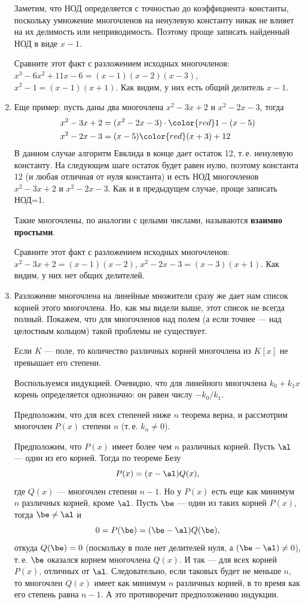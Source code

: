\begin{enumerate}
Заметим, что НОД определяется с точностью до коэффициента--константы, поскольку умножение многочленов на ненулевую константу никак не влияет на их делимость или неприводимость. Поэтому проще записать найденный НОД в виде $x-1$.

Сравните этот факт с разложением исходных многочленов: $x^3-6x^2+11x-6=(x-1)(x-2)(x-3)$, $x^2-1=(x-1)(x+1)$. Как видим, у них есть общий делитель $x-1$.

\item Еще пример: пусть даны два многочлена $x^2-3x+2$ и $x^2-2x-3$, тогда
\begin{align*}
x^2-3x+2 & = (x^2-2x-3)\cdot{\color{red}1} - (x-5) \\
x^2-2x-3 & = (x-5){\color{red}(x+3)} + 12
\end{align*}
В данном случае алгоритм Евклида в конце дает остаток 12, т.\,е. ненулевую константу. На следующем шаге остаток будет равен нулю, поэтому константа 12 (и любая отличная от нуля константа) и есть НОД многочленов $x^2-3x+2$ и $x^2-2x-3$. Как и в предыдущем случае, проще записать НОД=1.

Такие многочлены, по аналогии с целыми числами, называются \textbf{взаимно простыми}.

Сравните этот факт с разложением исходных многочленов: $x^2-3x+2=(x-1)(x-2)$, $x^2-2x-3=(x-3)(x+1)$. Как видим, у них нет общих делителей.


\item Разложение многочлена на линейные множители сразу же дает нам список корней этого многочлена. Но, как мы видели выше, этот список не всегда полный. Покажем, что для многочленов над полем (а если точнее --- над целостным кольцом) такой проблемы не существует.
\begin{thrm}
Если $K$ --- поле, то количество различных корней многочлена из $K[x]$ не превышает его степени.
\end{thrm}
\pf
Воспользуемся индукцией. Очевидно, что для линейного многочлена $k_0+k_1x$ корень определяется однозначно: он равен числу $-k_0/k_1$.

Предположим, что для всех степеней ниже $n$ теорема верна, и рассмотрим многочлен $P(x)$ степени $n$ (т.\,е. $k_n\ne 0$).

Предположим, что $P(x)$ имеет более чем $n$ различных корней. Пусть $\al$ --- один из его корней. Тогда по теореме Безу
\begin{equation}\label{PQ}
P(x)=(x-\al)Q(x),
\end{equation}
где $Q(x)$ --- многочлен степени $n-1$. Но у $P(x)$ есть еще как минимум $n$ различных корней, кроме $\al$. Пусть $\be$ --- один из таких корней $P(x)$, тогда $\be\ne\al$ и
$$
0=P(\be)=(\be-\al)Q(\be),
$$
откуда $Q(\be)=0$ (поскольку в поле нет делителей нуля, а $(\be-\al)\ne 0$),
т.\,е. $\be$ оказался корнем многочлена $Q(x)$. И так --- для всех корней $P(x)$, отличных от $\al$. Следовательно, если таковых будет не меньше $n$, то многочлен $Q(x)$ имеет как минимум $n$ различных корней, в то время как его степень равна $n-1$. А это противоречит предположению индукции.


\end{enumerate}
